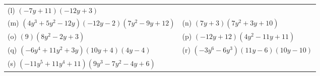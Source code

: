 \begin{enumerate}[noitemsep, label=\textbf{\arabic*}. ]
{{\begin{center}
\begin{tabular}[t]{|l|l|}
        (l) $\left(-7y+11\right)\left(-12y+3\right)$%
     \tabularnewline\cline{1-1}\cline{2-2}
        (m) $\left(4{y}^{3}+5{y}^{2}-12y\right)\left(-12y-2\right)\left(7{y}^{2}-9y+12\right)$ &
        (n) $\left(7y+3\right)\left(7{y}^{2}+3y+10\right)$%
     \tabularnewline\cline{1-1}\cline{2-2}
        (o) $\left(9\right)\left(8{y}^{2}-2y+3\right)$ &
        (p) $\left(-12y+12\right)\left(4{y}^{2}-11y+11\right)$%
     \tabularnewline\cline{1-1}\cline{2-2}
        (q) $\left(-6{y}^{4}+11{y}^{2}+3y\right)\left(10y+4\right)\left(4y-4\right)$ &
        (r) $\left(-3{y}^{6}-6{y}^{3}\right)\left(11y-6\right)\left(10y-10\right)$%
     \tabularnewline\cline{1-1}\cline{2-2}
        (s) $\left(-11{y}^{5}+11{y}^{4}+11\right)\left(9{y}^{3}-7{y}^{2}-4y+6\right)$ &

\end{tabular}
\end{center}}}
\end{enumerate}
